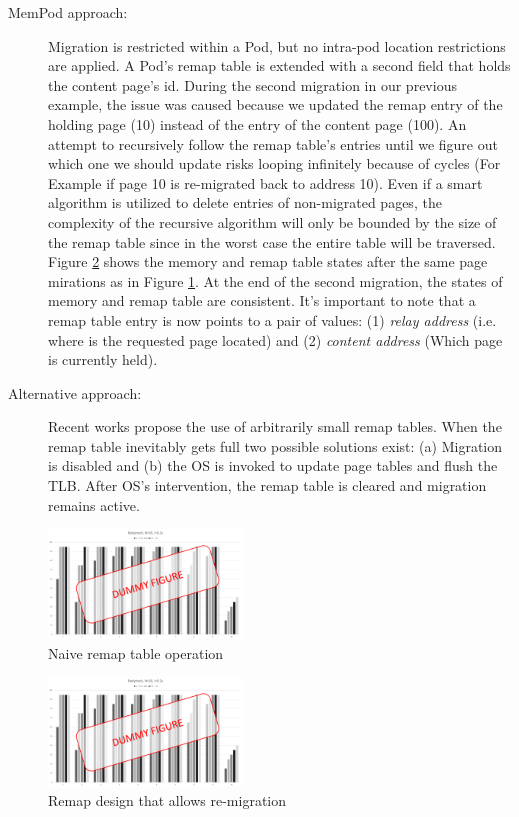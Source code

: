 \begin{description}
	\item[MemPod approach:] Migration is restricted within a Pod, but no intra-pod location restrictions are applied. A Pod's remap table is extended with a second field that holds the content page's id. During the second migration in our previous example, the issue was caused because we updated the remap entry of the holding page (10) instead of the entry of the content page (100). An attempt to recursively follow the remap table's entries until we figure out which one we should update risks looping infinitely because of cycles (For Example if page 10 is re-migrated back to address 10). Even if a smart algorithm is utilized to delete entries of non-migrated pages, the complexity of the recursive algorithm will only be bounded by the size of the remap table since in the worst case the entire table will be traversed. Figure \ref{fig:correct_remap} shows the memory and remap table states after the same page mirations as in Figure \ref{fig:failed_remap}. At the end of the second migration, the states of memory and remap table are consistent. It's important to note that a remap table entry is now points to a pair of values: (1) \textit{relay address} (i.e. where is the requested page located) and (2) \textit{content address} (Which page is currently held).
	\item[Alternative approach:] Recent works propose the use of arbitrarily small remap tables. When the remap table inevitably gets full two possible solutions exist: (a) Migration is disabled and (b) the OS is invoked to update page tables and flush the TLB. After OS's intervention, the remap table is cleared and migration remains active.
\end{description}


\begin{figure}[h]
  \includegraphics[width=0.46\textwidth]{figures/dummy.pdf}
  \caption{Naive remap table operation}
  \label{fig:failed_remap}
\end{figure}

\begin{figure}[h]
  \includegraphics[width=0.46\textwidth]{figures/dummy.pdf}
  \caption{Remap design that allows re-migration}
  \label{fig:correct_remap}
\end{figure}


